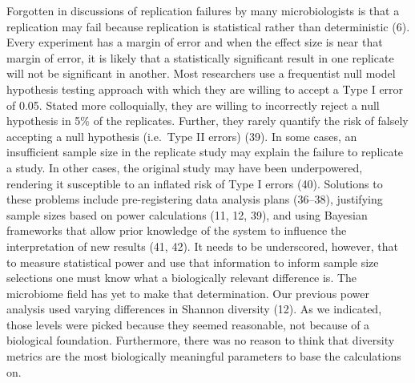 \documentclass[]{article}
\begin{document}
Forgotten in discussions of replication failures by many microbiologists
is that a replication may fail because replication is statistical rather
than deterministic (6). Every experiment has a margin of error and when
the effect size is near that margin of error, it is likely that a
statistically significant result in one replicate will not be
significant in another. Most researchers use a frequentist null model
hypothesis testing approach with which they are willing to accept a Type
I error of 0.05. Stated more colloquially, they are willing to
incorrectly reject a null hypothesis in 5\% of the replicates. Further,
they rarely quantify the risk of falsely accepting a null hypothesis
(i.e.~Type II errors) (39). In some cases, an insufficient sample size
in the replicate study may explain the failure to replicate a study. In
other cases, the original study may have been underpowered, rendering it
susceptible to an inflated risk of Type I errors (40). Solutions to
these problems include pre-registering data analysis plans (36--38),
justifying sample sizes based on power calculations (11, 12, 39), and
using Bayesian frameworks that allow prior knowledge of the system to
influence the interpretation of new results (41, 42). It needs to be
underscored, however, that to measure statistical power and use that
information to inform sample size selections one must know what a
biologically relevant difference is. The microbiome field has yet to
make that determination. Our previous power analysis used varying
differences in Shannon diversity (12). As we indicated, those levels
were picked because they seemed reasonable, not because of a biological
foundation. Furthermore, there was no reason to think that diversity
metrics are the most biologically meaningful parameters to base the
calculations on.
\end{document}
